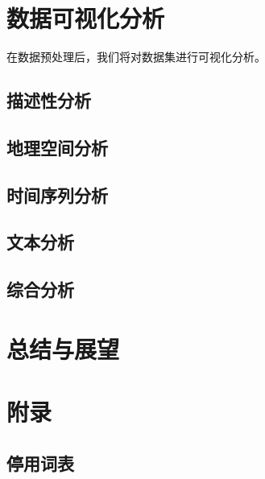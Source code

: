 \documentclass[UTF8]{ctexart}
\begin{document}
\section{数据可视化分析}

在数据预处理后，我们将对数据集进行可视化分析。

\subsection{描述性分析}


\subsection{地理空间分析}


\subsection{时间序列分析}


\subsection{文本分析}


\subsection{综合分析}

\pagebreak

\section{总结与展望}


\appendix
\section{附录}

\subsection{停用词表} \label{sec:停用词表}
\end{document}
